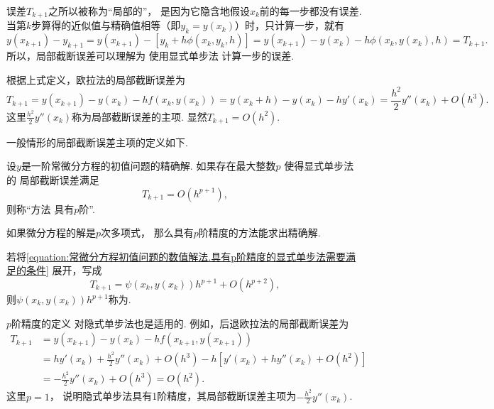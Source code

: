 误差\(T_{k+1}\)之所以被称为“局部的”，
是因为它隐含地假设\(x_k\)前的每一步都没有误差.
当第\(k\)步算得的近似值与精确值相等（即\(y_k = y(x_k)\)）时，只计算一步，就有\begin{equation*}
	y(x_{k+1}) - y_{k+1}
	= y(x_{k+1}) - [y_k + h \phi(x_k,y_k,h)]
	= y(x_{k+1}) - y(x_k) - h \phi(x_k,y(x_k),h)
	= T_{k+1}.
\end{equation*}
所以，局部截断误差可以理解为
使用显式单步法 
计算一步的误差.

根据上式定义，欧拉法的局部截断误差为\begin{equation*}
	T_{k+1}
	= y(x_{k+1}) - y(x_k) - h f(x_k,y(x_k))
	= y(x_k + h)
	- y(x_k)
	- h y'(x_k)
	= \frac{h^2}{2} y''(x_k)
	+ O(h^3).
\end{equation*}
这里\(\frac{h^2}{2} y''(x_k)\)称为局部截断误差的主项.
显然\(T_{k+1} = O(h^2)\).

一般情形的局部截断误差主项的定义如下.
\begin{definition}
设\(y\)是一阶常微分方程的初值问题的精确解.
如果存在最大整数\(p\)
使得显式单步法  的
局部截断误差满足\begin{equation}\label{equation:常微分方程初值问题的数值解法.具有p阶精度的显式单步法需要满足的条件}
	T_{k+1}
	= O(h^{p+1}),
\end{equation}
则称“方法 
具有\(p\)阶”.
\end{definition}

如果微分方程的解是\(p\)次多项式，
那么具有\(p\)阶精度的方法能求出精确解.

若将\cref{equation:常微分方程初值问题的数值解法.具有p阶精度的显式单步法需要满足的条件}
展开，写成\begin{equation*}
	T_{k+1}
	= \psi(x_k,y(x_k)) h^{p+1}
	+ O(h^{p+2}),
\end{equation*}
则\(\psi(x_k,y(x_k)) h^{p+1}\)称为.

\(p\)阶精度的定义
对隐式单步法也是适用的.
例如，后退欧拉法的局部截断误差为\begin{align*}
	T_{k+1}
	&= y(x_{k+1})
	- y(x_k)
	- h f(x_{k+1},y(x_{k+1})) \\
	&= h y'(x_k)
	+ \frac{h^2}{2} y''(x_k)
	+ O(h^3)
	- h [
		y'(x_k)
		+ h y''(x_k)
		+ O(h^2)
	] \\
	&= -\frac{h^2}{2} y''(x_k)
	+ O(h^3)
	= O(h^2).
\end{align*}
这里\(p=1\)，
说明隐式单步法具有1阶精度，其局部截断误差主项为\(-\frac{h^2}{2} y''(x_k)\).

